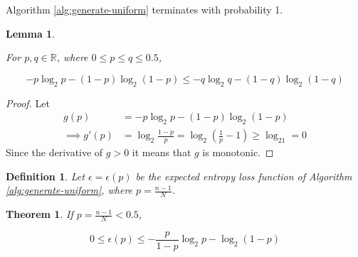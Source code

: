 \documentclass[12pt]{article}
\newtheorem{lemma}{Lemma}
\newtheorem{definition}{Definition}
\newtheorem{theorem}{Theorem}
\begin{document}
Algorithm \ref{alg:generate-uniform} terminates with probability 1.

\begin{lemma}
    \label{lem:shannon-inequality}

For $p,q \in \mathbb{R}$, where $0 \le p\le q \le 0.5$, 

\begin{equation}
-p\log_2 p - (1-p)\log_2(1-p) \le -q\log_2 q - (1-q)\log_2(1-q)
\end{equation}
\end{lemma}

\begin{proof}
    Let
    \begin{align}
        g(p) & = -p\log_2 p - (1-p)\log_2(1-p) \\
        \implies g'(p) & = \log_2\frac{1-p}{p} = \log_2(\frac{1}{p}-1) \ge \log_21 = 0 
    \end{align}
Since the derivative of $g>0$ it means that $g$ is monotonic.
\end{proof}

\begin{definition}
    Let $\epsilon = \epsilon(p)$ be the expected entropy loss function of Algorithm \ref{alg:generate-uniform}, where $p=\frac{n-1}{N}$.
\end{definition}

\begin{theorem}
    \label{thm:loss}
If $p = \frac{n-1}{N} < 0.5$,

\begin{equation}
0 \le \epsilon(p) \le -\frac{p}{1-p}\log_2p - \log_2(1-p)
\end{equation}

\end{theorem}
\end{document}
